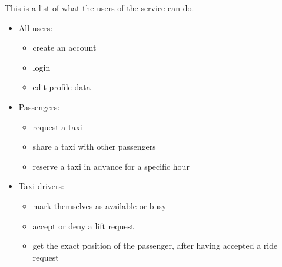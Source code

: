 This is a list of what the users of the service can do.
\begin{itemize}
    \item All users:
        \begin{itemize}
            \item create an account
            \item login
            \item edit profile data
        \end{itemize}
    \item Passengers:
        \begin{itemize}
            \item request a taxi
            \item share a taxi with other passengers
            \item reserve a taxi in advance for a specific hour
        \end{itemize}
    \item Taxi drivers:
        \begin{itemize}
            \item mark themselves as available or busy
            \item accept or deny a lift request
            \item get the exact position of the passenger, after having accepted a ride request
        \end{itemize}
\end{itemize}

